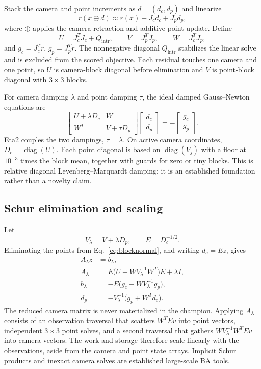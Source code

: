 \documentclass[10pt]{article}
\begin{document}
Stack the camera and point increments as $d=(d_c,d_p)$ and linearize
\[
  r(x\oplus d)\approx r(x)+J_cd_c+J_pd_p,
\]
where $\oplus$ applies the camera retraction and additive point update.  Define
\[
  U=J_c^TJ_c+Q_{\mathrm{intr}},\qquad
  V=J_p^TJ_p,\qquad
  W=J_c^TJ_p,
\]
and $g_c=J_c^Tr$, $g_p=J_p^Tr$.  The nonnegative diagonal $Q_{\mathrm{intr}}$ stabilizes the linear solve and is excluded from the scored objective.  Each residual touches one camera and one point, so $U$ is camera-block diagonal before elimination and $V$ is point-block diagonal with $3\times3$ blocks.

For camera damping $\lambda$ and point damping $\tau$, the ideal damped Gauss--Newton equations are
\begin{equation}
\begin{bmatrix}
U+\lambda D_c & W\\
W^T & V+\tau D_p
\end{bmatrix}
\begin{bmatrix}d_c\\d_p\end{bmatrix}
=-
\begin{bmatrix}g_c\\g_p\end{bmatrix}. \label{eq:blocknormal}
\end{equation}
Eta2 couples the two dampings, $\tau=\lambda$.  On active camera coordinates, $D_c=\operatorname{diag}(U)$.  Each point diagonal is based on $\operatorname{diag}(V_j)$ with a floor at $10^{-3}$ times the block mean, together with guards for zero or tiny blocks.  This is relative diagonal Levenberg--Marquardt damping; it is an established foundation rather than a novelty claim.

\subsection{Schur elimination and scaling}

Let
\[
  V_\lambda=V+\lambda D_p,\qquad E=D_c^{-1/2}.
\]
Eliminating the points from Eq.~\eqref{eq:blocknormal}, and writing $d_c=Ez$, gives
\begin{align}
 A_\lambda z&=b_\lambda,\label{eq:schur-system}\\
 A_\lambda&=E\bigl(U-WV_\lambda^{-1}W^T\bigr)E+\lambda I,\label{eq:schur-op}\\
 b_\lambda&=-E\bigl(g_c-WV_\lambda^{-1}g_p\bigr),\label{eq:schur-rhs}\\
 d_p&=-V_\lambda^{-1}\bigl(g_p+W^Td_c\bigr).\label{eq:backsub}
\end{align}
The reduced camera matrix is never materialized in the champion.  Applying $A_\lambda$ consists of an observation traversal that scatters $W^TEv$ into point vectors, independent $3\times3$ point solves, and a second traversal that gathers $WV_\lambda^{-1}W^TEv$ into camera vectors.  The work and storage therefore scale linearly with the observations, aside from the camera and point state arrays.  Implicit Schur products and inexact camera solves are established large-scale BA tools\cite{Agarwal2010}.
\end{document}
